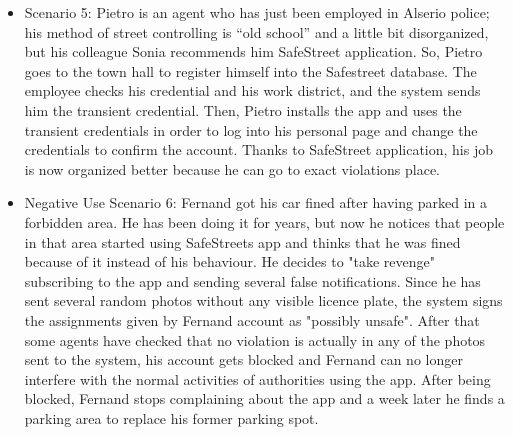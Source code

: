 \begin{itemize}
\item Scenario 5:
\newline
Pietro is an agent who has just been employed in Alserio police; his method of street controlling is “old school” and a little bit disorganized, but his colleague Sonia recommends him SafeStreet application. So, Pietro goes to the town hall to register himself into the Safestreet database. The employee checks his credential and his work district, and the system sends him the transient credential.  Then, Pietro installs the app and uses the transient credentials in order to log into his personal page and change the credentials to confirm the account. Thanks to SafeStreet application, his job is now organized better because he can go to exact violations place.
\item  Negative Use Scenario 6:
\newline
Fernand got his car fined after having parked in a forbidden area. He has been doing it for years, but now he notices that people in that area started using SafeStreets app and thinks that he was fined because of it instead of his behaviour. He decides to "take revenge" subscribing to the app and sending several false notifications. Since he has sent several random photos without any visible licence plate, the system signs the assignments given by Fernand account as "possibly unsafe". After that some agents have checked that no violation is actually in any of the photos sent to the system, his account gets blocked and Fernand can no longer interfere with the normal activities of authorities using the app. After being blocked, Fernand stops complaining about the app and a week later he finds a parking area to replace his former parking spot.
\end{itemize}
\newpage
